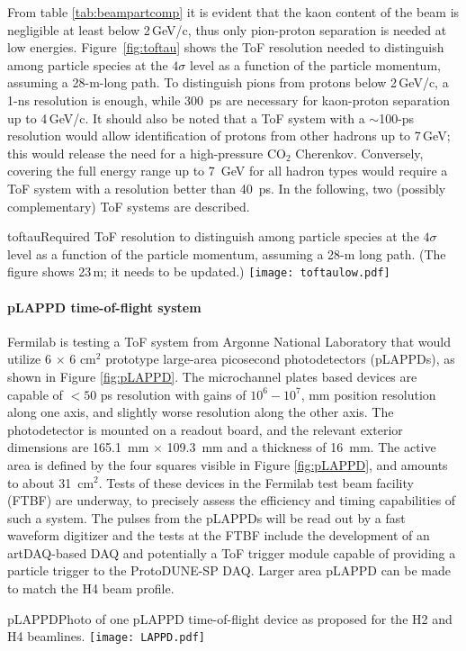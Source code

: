   From table \ref{tab:beampartcomp} it is evident that the kaon content of the beam is negligible at least below 2\,GeV/c, thus  only pion-proton separation is needed at low energies. Figure~\ref{fig:toftau} shows the ToF resolution needed to distinguish among particle species at the $4\sigma$ level as a function of the particle momentum, assuming a 28-m-long path. To distinguish pions from protons below 2\,GeV/c, a 1-ns resolution is enough, while 300~ps are necessary for kaon-proton separation up to  4\,GeV/c. It should also be noted that a ToF system with a $\sim$100-ps resolution would allow identification of protons from other hadrons up to 7\,GeV; this would release the need for a %
  high-pressure CO$_2$ Cherenkov. %
  Conversely, covering %
  the full energy range up to 7~GeV for all hadron  types would require a ToF system with a resolution better than 40~ps. %
In the following, two (possibly complementary) ToF systems are described.
\begin{cdrfigure}{toftau}{Required ToF resolution to  distinguish among particle species at the $4\sigma$ level as a function of the particle momentum, assuming a 28-m long path. (The figure shows 23\,m; it needs to be updated.) }
\texttt{[image: toftaulow.pdf]}
\end{cdrfigure}

\paragraph{pLAPPD time-of-flight system}
Fermilab is testing a ToF system from Argonne National Laboratory that would utilize  
6 $\times$ 6 cm$^2$ prototype
large-area picosecond photodetectors (pLAPPDs), as shown in Figure \ref{fig:pLAPPD}.
 The microchannel plates based devices
are capable of $< 50$ ps resolution with gains of $10^6-10^7$,
mm position resolution along one axis, and slightly worse resolution
along the other axis.  The photodetector is mounted on a readout
board, and the relevant exterior dimensions are 165.1~mm $\times$ 109.3~mm and a
thickness of 16~mm. The active area is defined by the four squares visible in Figure \ref{fig:pLAPPD}, and amounts to about 31~cm$^2$. Tests of these devices in the Fermilab test beam facility (FTBF) are underway, to precisely assess the efficiency and timing capabilities of such a system. 
The pulses from the pLAPPDs will be read out by a fast waveform digitizer and the tests at the FTBF include the development of an artDAQ-based DAQ and potentially a ToF trigger module capable of providing a particle trigger to the ProtoDUNE-SP DAQ.
Larger area pLAPPD can be made to match the H4 beam profile.
\begin{cdrfigure}{pLAPPD}{Photo of one pLAPPD  time-of-flight device as proposed for the H2 and H4 beamlines.}
\texttt{[image: LAPPD.pdf]}
\end{cdrfigure}


